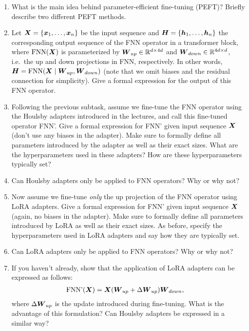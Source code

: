 \documentclass[11pt,a4paper]{article}
\newcommand\op[1]{\operatorname{#1}}
\begin{document}
\begin{enumerate}[label=(\alph*)]
    \item What is the main idea behind parameter-efficient fine-tuning (PEFT)?
          Briefly describe two different PEFT methods.
    \item Let ${\boldsymbol{X}} = \{{\boldsymbol{x}}_1,\ldots,{\boldsymbol{x}}_n\}$ be the input sequence and
          ${\boldsymbol{H}} = \{{\boldsymbol{h}}_1,\ldots, {\boldsymbol{h}}_n\}$ the corresponding output sequence of
          the FNN operator in a transformer block, where $\op{FNN}(\mX)$ is
          parameterized by ${\boldsymbol{W}}_{up}\in\mathbb{R}^{d\times 4d}$ and
          ${\boldsymbol{W}}_{down}\in\mathbb{R}^{4d\times d}$, i.e.\ the up and down projections
          in FNN, respectively.
          In other words, $\mH = \op{FNN}(\mX\mid \mW_{up}, \mW_{down})$ (note
          that we omit biases and the residual connection for simplicity).
          Give a formal expression for the output of this FNN operator.
    \item Following the previous subtask, assume we fine-tune the FNN operator
          using the Houlsby adapters introduced in the lectures, and call this
          fine-tuned operator FNN'.
          Give a formal expression for FNN' given input sequence ${\boldsymbol{X}}$ (don't
          use any biases in the adapter).
          Make sure to formally define all parameters introduced by the adapter
          as well as their exact sizes.
          What are the hyperparameters used in these adapters? How are these
          hyperparameters typically set?
    \item Can Houlsby adapters only be applied to FNN operators? Why or why not?
    \item Now assume we fine-tune \emph{only} the up projection of the FNN
          operator using LoRA adapters.
          Give a formal expression for FNN' given input sequence ${\boldsymbol{X}}$ (again,
          no biases in the adapter).
          Make sure to formally define all parameters introduced by LoRA as well
          as their exact sizes.
          As before, specify the hyperparameters used in LoRA adapters and
          say how they are typically set.
    \item Can LoRA adapters only be applied to FNN operators? Why or why not?
    \item If you haven't already, show that the application of LoRA adapters
          can be expressed as follows:
          \begin{align}
              \op{FNN'}(\mX) & = \mX(\mW_{up} + \Delta\mW_{up})\mW_{down},
          \end{align}
          where $\Delta{\boldsymbol{W}}_{up}$ is the update introduced during fine-tuning.
          What is the advantage of this formulation?
          Can Houlsby adapters be expressed in a similar way?
\end{enumerate}
\end{document}

